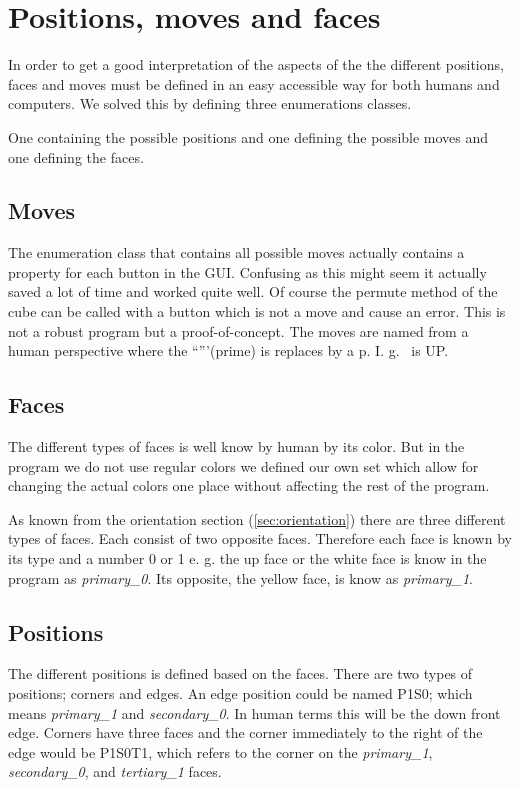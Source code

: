 \section{Positions, moves and faces}
In order to get a good interpretation of the aspects of the \cube{} the different positions, faces and moves must be defined in an easy accessible way for both humans and computers. We solved this by defining three enumerations classes. 

One containing the possible positions and one defining the possible moves and one defining the faces.

\subsection{Moves}
The enumeration class that contains all possible moves actually contains a property for each button in the GUI. Confusing as this might seem it actually saved a lot of time and worked quite well. Of course the permute method of the cube can be called with a button which is not a move and cause an error. This is not a robust program but a proof-of-concept. 
The moves are named from a human perspective where the ``'''(prime) is replaces by a p. I. g.  is UP.  

\subsection{Faces}
The different types of faces is well know by human by its color.
But in the program we do not use regular colors we defined our own set which allow for changing the actual colors one place without affecting the rest of the program. 

As known from the orientation section (\ref{sec:orientation}) there are three different types of faces.
Each consist of two opposite faces. Therefore each face is known by its type and a number 0 or 1 e. g. the up face or the white face is know in the program as \textit{primary\_0}.
Its opposite, the yellow face, is know as \textit{primary\_1}. 

\subsection{Positions}
The different positions is defined based on the faces. There are two types of positions; corners and edges.
An edge position could be named P1S0; which means \textit{primary\_1} and \textit{secondary\_0}.
In human terms this will be the down front edge.
Corners have three faces and the corner immediately to the right of the edge would be P1S0T1, which refers to the corner on the \textit{primary\_1}, \textit{secondary\_0}, and \textit{tertiary\_1} faces.
